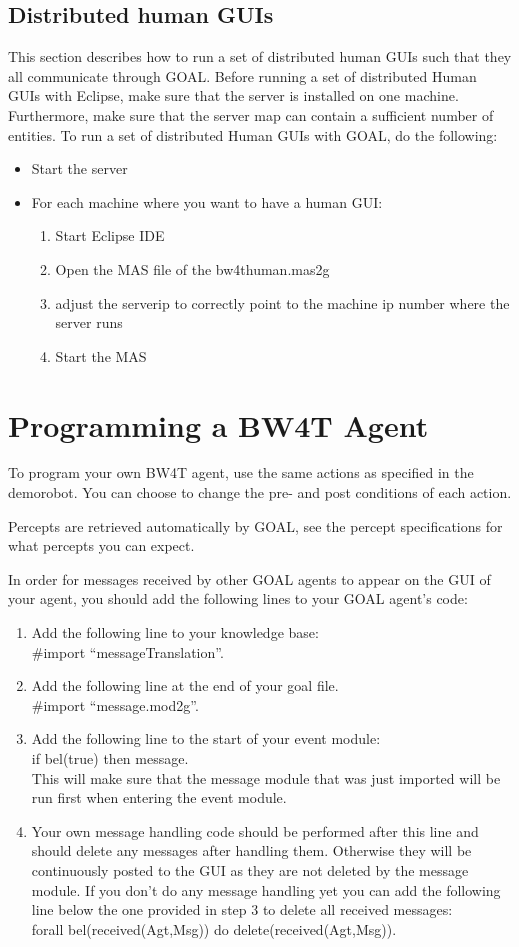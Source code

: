 \documentclass[11pt,a4paper]{article}
\begin{document}
\subsection{Distributed human GUIs}
This section describes how to run a set of distributed human GUIs such that they all communicate through GOAL. Before running a set of distributed Human GUIs with Eclipse, make sure that the server is installed on one machine. Furthermore, make sure that the server map can contain a sufficient number of entities.
To run a set of distributed Human GUIs with GOAL, do the following:
\begin{itemize}
\item Start the server
\item For each machine where you want to have a human GUI:
    \begin{enumerate}
    \item Start  Eclipse IDE
    \item Open the MAS file of the bw4thuman.mas2g
    \item adjust the serverip to correctly point to the machine ip number where the server runs
    \item Start the MAS
    \end{enumerate}
\end{itemize}

\section{Programming a BW4T Agent}
To program your own BW4T agent, use the same actions as specified in the demorobot. You can  choose to change the pre- and post conditions of each action.

Percepts are retrieved automatically by GOAL, see the percept specifications for what percepts you can expect.

In order for messages received by other GOAL agents to appear on the GUI of your agent, you should add the following lines to your GOAL agent’s code:
\begin{enumerate}
\item Add the following line to your knowledge base:\\
\#import “messageTranslation”.
\item Add the following line at the end of your goal file. \\
\#import “message.mod2g”.
\item Add the following line to the start of your event module: \\
if bel(true) then message. \\
This will make sure that the message module that was just imported will be run first when entering the event module.
\item Your own message handling code should be performed after this line and should delete any messages after handling them. Otherwise they will be continuously posted to the GUI as they are not deleted by the message module. If you don’t do any message handling yet you can add the following line below the one provided in step 3 to delete all received messages: \\
forall bel(received(Agt,Msg)) do delete(received(Agt,Msg)).
\end{enumerate}
\end{document}
